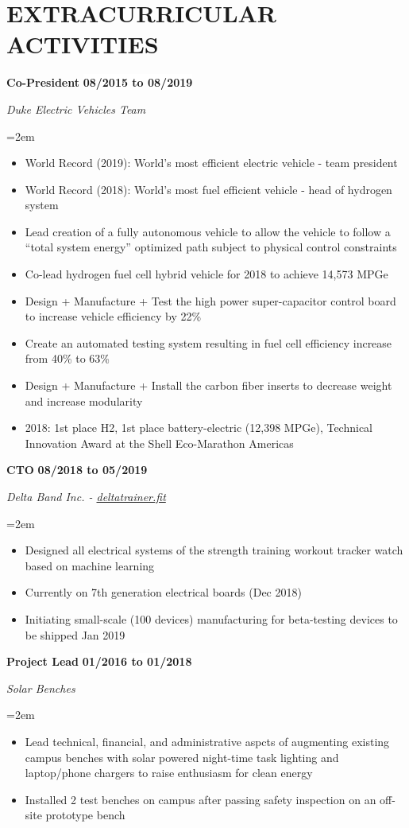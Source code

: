 \documentclass[paper=letter,fontsize=11pt]{scrartcl} %
\newcommand{\sepspace}{\vspace*{0em}}		%
\newcommand{\NewPart}[2]{\section*{\uppercase{#1} #2}}
\newcommand{\EducationEntry}[4]{
		\noindent \textbf{#1} \hfill      %
		\colorbox{White}{%
			\bf 
			\parbox{10em}{%
			\hfill\color{Black}#2}} \par  %
		\noindent \textit{#3} \par        %
		\noindent\hangindent=2em\hangafter=0 \small #4 %
		\normalsize \par}
\newcommand{\WorkEntry}[4]{				  %
		\noindent \textbf{#1} \hfill      %
		\colorbox{White}{\bf \color{Black}#2} \par  %
		\noindent \textit{#3} \par              %
		\noindent\hangindent=2em\hangafter=0 \small #4 %
		\normalsize \par}
\begin{document}
\NewPart{Extracurricular Activities}{}

\WorkEntry{Co-President}{08/2015 to 08/2019}{Duke Electric Vehicles Team}{
	\begin{itemize}
		\item World Record (2019): World's most efficient electric vehicle - team president
		\item World Record (2018): World's most fuel efficient vehicle - head of hydrogen system
		\item Lead creation of a fully autonomous vehicle to allow the vehicle to follow a ``total system energy'' optimized path subject to physical control constraints
		\item Co-lead hydrogen fuel cell hybrid vehicle for 2018 to achieve 14,573 MPGe
		\item Design + Manufacture + Test the high power super-capacitor control board to increase vehicle efficiency by 22\%
		\item Create an automated testing system resulting in fuel cell efficiency increase from 40\% to 63\%
		\item Design + Manufacture + Install the carbon fiber inserts to decrease weight and increase modularity
		\item 2018: 1st place H2, 1st place battery-electric (12,398 MPGe), Technical Innovation Award at the Shell Eco-Marathon Americas
	\end{itemize}
}
\sepspace

\WorkEntry{CTO}{08/2018 to 05/2019}{Delta Band Inc. - \href{deltatrainer.fit}{deltatrainer.fit}}{
	\begin{itemize}
		\item Designed all electrical systems of the strength training workout tracker watch based on machine learning
		\item Currently on 7th generation electrical boards (Dec 2018)
		\item Initiating small-scale (100 devices) manufacturing for beta-testing devices to be shipped Jan 2019
	\end{itemize}
}
\sepspace

\WorkEntry{Project Lead}{01/2016 to 01/2018}{Solar Benches}{
	\begin{itemize}
		\item Lead technical, financial, and administrative aspcts of augmenting existing campus benches with solar powered night-time task lighting and laptop/phone chargers to raise enthusiasm for clean energy
		\item Installed 2 test benches on campus after passing safety inspection on an off-site prototype bench
	\end{itemize}
}
\end{document}
